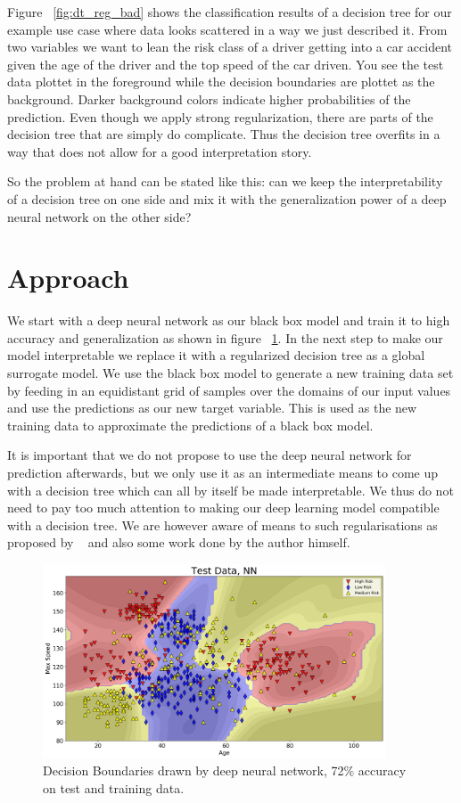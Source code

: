 \documentclass{article} %
\begin{document}
Figure ~\ref{fig:dt_reg_bad} shows the classification results of a decision tree for our example use case where data looks scattered in a way we just described it. From two variables we want to lean the risk class of a driver getting into a car accident given the age of the driver and the top speed of the car driven. You see the test data plottet in the foreground while the decision boundaries are plottet as the background. Darker background colors indicate higher probabilities of the prediction. Even though we apply strong regularization, there are parts of the decision tree that are simply do complicate. Thus the decision tree overfits in a way that does not allow for a good interpretation story.

So the problem at hand can be stated like this: can we keep the interpretability of a decision tree on one side and mix it with the generalization power of a deep neural network on the other side?

\section{Approach}

We start with a deep neural network as our black box model and train it to high accuracy and generalization as shown in figure ~\ref{fig:nn-decision-boundaries}. In the next step to make our model interpretable we replace it with a regularized decision tree as a global surrogate model. We use the black box model to generate a new training data set by feeding in an equidistant grid of samples over the domains of our input values and use the predictions as our new target variable. This is used as the new training data to approximate the predictions of a black box model.

It is important that we do not propose to use the deep neural network for prediction afterwards, but we only use it as an intermediate means to come up with a decision tree which can all by itself be made interpretable. We thus do not need to pay too much attention to making our deep learning model compatible with a decision tree. We are however aware of means to such regularisations as proposed by ~\citep{schaaf2019enhancing} and also some work done by the author himself. 

\begin{figure}[h]
\begin{center}
\includegraphics[width=4.0in]{nn.png}
\end{center}
\caption{Decision Boundaries drawn by deep neural network, 72\% accuracy on test and training data.}
\label{fig:nn-decision-boundaries}
\end{figure}
\end{document}
